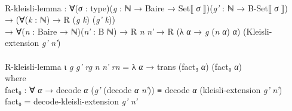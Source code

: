 \documentclass{entcs} \usepackage{prentcsmacro}
\newcommand{\AgdaFontStyle}[1]{\textsf{#1}}
\newcommand{\AgdaBoundFontStyle}[1]{\textit{#1}}
\newcommand{\AgdaKeyword}     [1]
    {\AgdaFontStyle{\textcolor{AgdaKeyword}{#1}}}
\newcommand{\AgdaSymbol}      [1]{\textcolor{AgdaSymbol}{#1}}
\newcommand{\AgdaBound}    [1]{\AgdaBoundFontStyle{\textcolor{AgdaBound}{#1}}}
\newcommand{\AgdaInductiveConstructor}[1]
    {\AgdaFontStyle{\textcolor{AgdaInductiveConstructor}{#1}}}
\newcommand{\AgdaDatatype} [1]{\AgdaFontStyle{\textcolor{AgdaDatatype}{#1}}}
\newcommand{\AgdaFunction} [1]{\AgdaFontStyle{\textcolor{AgdaFunction}{#1}}}
\newcommand{\AgdaIndent}[1]{\quad}
\newcommand{\AgdaCodeStyle}{\small}
\newenvironment{code}%
{\noindent\AgdaCodeStyle\pboxed}%
{\endpboxed\par\noindent%
\ignorespacesafterend}
\begin{document}
\begin{code}\>\<%
\\
\>\AgdaFunction{R-kleisli-lemma} \AgdaSymbol{:} \AgdaSymbol{∀(}\AgdaBound{σ} \AgdaSymbol{:} \AgdaDatatype{type}\AgdaSymbol{)(}\AgdaBound{g} \AgdaSymbol{:} \AgdaDatatype{ℕ} \AgdaSymbol{→} \AgdaFunction{Baire} \AgdaSymbol{→} \AgdaFunction{Set⟦} \AgdaBound{σ} \AgdaFunction{⟧}\AgdaSymbol{)(}\AgdaBound{g'} \AgdaSymbol{:} \AgdaDatatype{ℕ} \AgdaSymbol{→} \AgdaFunction{B-Set⟦} \AgdaBound{σ} \AgdaFunction{⟧}\AgdaSymbol{)}\<%
\\
\>[0]\AgdaIndent{2}{}\<[2]%
\>[2]\AgdaSymbol{→} \AgdaSymbol{(∀(}\AgdaBound{k} \AgdaSymbol{:} \AgdaDatatype{ℕ}\AgdaSymbol{)} \AgdaSymbol{→} \AgdaFunction{R} \AgdaSymbol{(}\AgdaBound{g} \AgdaBound{k}\AgdaSymbol{)} \AgdaSymbol{(}\AgdaBound{g'} \AgdaBound{k}\AgdaSymbol{))} \<[32]%
\>[32]\<%
\\
\>[0]\AgdaIndent{2}{}\<[2]%
\>[2]\AgdaSymbol{→} \AgdaSymbol{∀(}\AgdaBound{n} \AgdaSymbol{:} \AgdaFunction{Baire} \AgdaSymbol{→} \AgdaDatatype{ℕ}\AgdaSymbol{)(}\AgdaBound{n'} \AgdaSymbol{:} \AgdaFunction{B} \AgdaDatatype{ℕ}\AgdaSymbol{)} \AgdaSymbol{→} \AgdaFunction{R} \AgdaBound{n} \AgdaBound{n'} \AgdaSymbol{→} \AgdaFunction{R} \AgdaSymbol{(λ} \AgdaBound{α} \AgdaSymbol{→} \AgdaBound{g} \AgdaSymbol{(}\AgdaBound{n} \AgdaBound{α}\AgdaSymbol{)} \AgdaBound{α}\AgdaSymbol{)} \AgdaSymbol{(}\AgdaFunction{Kleisli-extension} \AgdaBound{g'} \AgdaBound{n'}\AgdaSymbol{)}\<%
\\
%
\\
\>\AgdaFunction{R-kleisli-lemma} \AgdaInductiveConstructor{ι} \AgdaBound{g} \AgdaBound{g'} \AgdaBound{rg} \AgdaBound{n} \AgdaBound{n'} \AgdaBound{rn} \AgdaSymbol{=} \AgdaSymbol{λ} \AgdaBound{α} \AgdaSymbol{→} \AgdaFunction{trans} \AgdaSymbol{(}\AgdaFunction{fact₃} \AgdaBound{α}\AgdaSymbol{)} \AgdaSymbol{(}\AgdaFunction{fact₀} \AgdaBound{α}\AgdaSymbol{)}\<%
\\
\>[0]\AgdaIndent{2}{}\<[2]%
\>[2]\AgdaKeyword{where}\<%
\\
\>[2]\AgdaIndent{4}{}\<[4]%
\>[4]\AgdaFunction{fact₀} \AgdaSymbol{:} \AgdaSymbol{∀} \AgdaBound{α} \AgdaSymbol{→} \AgdaFunction{decode} \AgdaBound{α} \AgdaSymbol{(}\AgdaBound{g'} \AgdaSymbol{(}\AgdaFunction{decode} \AgdaBound{α} \AgdaBound{n'}\AgdaSymbol{))} \AgdaDatatype{≡} \AgdaFunction{decode} \AgdaBound{α} \AgdaSymbol{(}\AgdaFunction{kleisli-extension} \AgdaBound{g'} \AgdaBound{n'}\AgdaSymbol{)} \<[83]%
\>[83]\<%
\\
\>[2]\AgdaIndent{4}{}\<[4]%
\>[4]\AgdaFunction{fact₀} \AgdaSymbol{=} \AgdaFunction{decode-kleisli-extension} \AgdaBound{g'} \AgdaBound{n'}\<%

\end{code}
\end{document}
